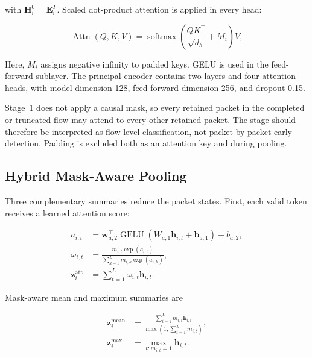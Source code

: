 \documentclass[11pt,fleqn]{report}
\begin{document}
with $\mathbf{H}^{0}_i=\mathbf{E}^{F}_i$. Scaled dot-product attention is applied in every head:

\begin{equation}
    \operatorname{Attn}(Q,K,V)
    =\operatorname{softmax}
      \left(
        \frac{QK^{\top}}{\sqrt{d_h}}+M_i
      \right)V,
    \label{eq:scaled_dot_product_attention}
\end{equation}

Here, $M_i$ assigns negative infinity to padded keys. GELU is used in the feed-forward sublayer. The principal encoder contains two layers and four attention heads, with model dimension 128, feed-forward dimension 256, and dropout 0.15.

Stage~1 does not apply a causal mask, so every retained packet in the completed or truncated flow may attend to every other retained packet. The stage should therefore be interpreted as flow-level classification, not packet-by-packet early detection. Padding is excluded both as an attention key and during pooling.

\subsection{Hybrid Mask-Aware Pooling}
\label{subsubsec:hybrid_pooling}

Three complementary summaries reduce the packet states. First, each valid token receives a learned attention score:

\begin{align}
    a_{i,t}
    &=\mathbf{w}_{a,2}^{\top}
      \operatorname{GELU}
      \left(W_{a,1}\mathbf{h}_{i,t}+\mathbf{b}_{a,1}\right)+b_{a,2},\\
    \omega_{i,t}
    &=\frac{m_{i,t}\exp(a_{i,t})}
      {\sum_{k=1}^{L}m_{i,k}\exp(a_{i,k})},\\
    \mathbf{z}^{\mathrm{att}}_i
    &=\sum_{t=1}^{L}\omega_{i,t}\mathbf{h}_{i,t}.
    \label{eq:stage1_attention_pooling}
\end{align}

Mask-aware mean and maximum summaries are

\begin{align}
    \mathbf{z}^{\mathrm{mean}}_i
    &=\frac{\sum_{t=1}^{L}m_{i,t}\mathbf{h}_{i,t}}
            {\max(1,\sum_{t=1}^{L}m_{i,t})},\\
    \mathbf{z}^{\mathrm{max}}_i
    &=\max_{t:m_{i,t}=1}\mathbf{h}_{i,t}.
    \label{eq:mean_max_pooling}
\end{align}
\end{document}
